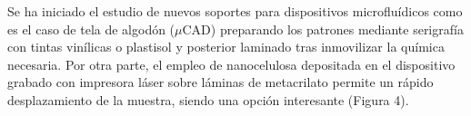 \documentclass{article}
\begin{document}
Se ha iniciado el estudio de nuevos soportes para dispositivos microfluídicos como es el caso de tela de algodón ($\mu$CAD) preparando los patrones mediante serigrafía con tintas vinílicas o plastisol y posterior laminado tras inmovilizar la química necesaria. Por otra parte, el empleo de nanocelulosa depositada en el dispositivo grabado con impresora láser sobre láminas de metacrilato permite un rápido desplazamiento de la muestra, siendo una opción interesante (Figura 4).\\






	
	
\end{document}
